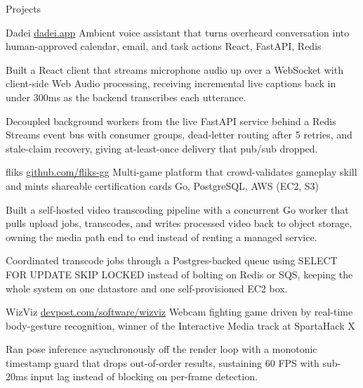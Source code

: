 \documentclass[
	11pt
]{../../../template}
\begin{document}
	\begin{rSection}{P}{rojects}
		\begin{rSectionEntry}
			{Dadei}
			{\href{https://dadei.app}{dadei.app}}
			{Ambient voice assistant that turns overheard conversation into human-approved calendar, email, and task actions}
			{React, FastAPI, Redis}
			{}

			\item Built a React client that streams microphone audio up over a WebSocket with client-side Web Audio processing, receiving incremental live captions back in under 300ms as the backend transcribes each utterance.
			\item Decoupled background workers from the live FastAPI service behind a Redis Streams event bus with consumer groups, dead-letter routing after 5 retries, and stale-claim recovery, giving at-least-once delivery that pub/sub dropped.
		\end{rSectionEntry}

		\begin{rSectionEntry}
			{fliks}
			{\href{https://github.com/fliks-gg}{github.com/fliks-gg}}
			{Multi-game platform that crowd-validates gameplay skill and mints shareable certification cards}
			{Go, PostgreSQL, AWS (EC2, S3)}
			{}

			\item Built a self-hosted video transcoding pipeline with a concurrent Go worker that pulls upload jobs, transcodes, and writes processed video back to object storage, owning the media path end to end instead of renting a managed service.
			\item Coordinated transcode jobs through a Postgres-backed queue using SELECT FOR UPDATE SKIP LOCKED instead of bolting on Redis or SQS, keeping the whole system on one datastore and one self-provisioned EC2 box.
		\end{rSectionEntry}

		\begin{rSectionEntry}
			{WizViz}
			{\href{https://devpost.com/software/wizviz}{devpost.com/software/wizviz}}
			{Webcam fighting game driven by real-time body-gesture recognition, winner of the Interactive Media track at SpartaHack X}
			{}
			{}

			\item Ran pose inference asynchronously off the render loop with a monotonic timestamp guard that drops out-of-order results, sustaining 60 FPS with sub-20ms input lag instead of blocking on per-frame detection.
		\end{rSectionEntry}
	\end{rSection}
\end{document}
